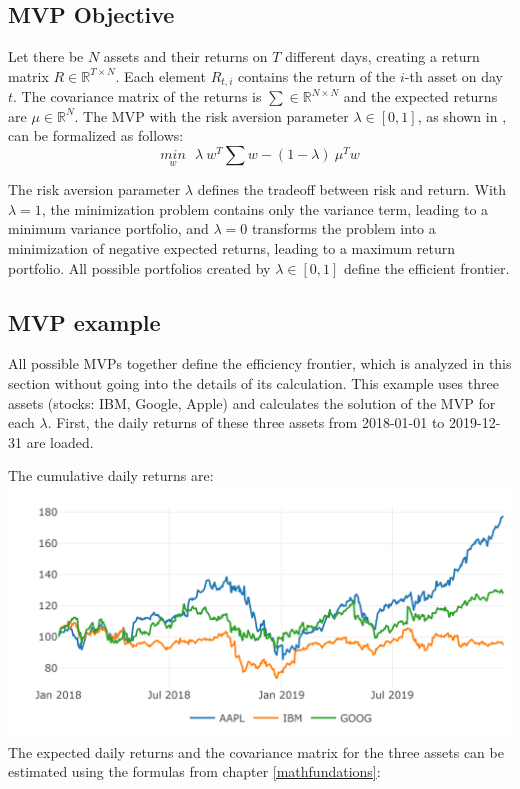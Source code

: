 \documentclass[
  oneside]{book}
\begin{document}
\hypertarget{mvp-objective}{%
\subsection{MVP Objective}\label{mvp-objective}}

Let there be \(N\) assets and their returns on \(T\) different days, creating a return matrix \(R \in \mathbb{R}^{T \times N}\). Each element \(R_{t,i}\) contains the return of the \(i\)-th asset on day \(t\). The covariance matrix of the returns is \(\textstyle\sum \in \mathbb{R}^{N \times N}\) and the expected returns are \(\mu \in \mathbb{R}^{N}\). The MVP with the risk aversion parameter \(\lambda \in [0,1]\), as shown in \citep{Mari2005}, can be formalized as follows:
\begin{equation} 
\underset{w}{min} \ \ \ \lambda \ w^T \textstyle\sum w - (1-\lambda) \ \mu^T w
\label{eq:MVP}
\end{equation}

The risk aversion parameter \(\lambda\) defines the tradeoff between risk and return. With \(\lambda = 1\), the minimization problem contains only the variance term, leading to a minimum variance portfolio, and \(\lambda = 0\) transforms the problem into a minimization of negative expected returns, leading to a maximum return portfolio. All possible portfolios created by \(\lambda \in [0, 1]\) define the efficient frontier.

\hypertarget{mvp-example}{%
\subsection{MVP example}\label{mvp-example}}

All possible MVPs together define the efficiency frontier, which is analyzed in this section without going into the details of its calculation. This example uses three assets (stocks: IBM, Google, Apple) and calculates the solution of the MVP for each \(\lambda\). First, the daily returns of these three assets from 2018-01-01 to 2019-12-31 are loaded.

The cumulative daily returns are:\\
\includegraphics{Master_Thesis_files/figure-latex/MVP_ex2-1.png}
The expected daily returns and the covariance matrix for the three assets can be estimated using the formulas from chapter \ref{mathfundations}:
\end{document}
